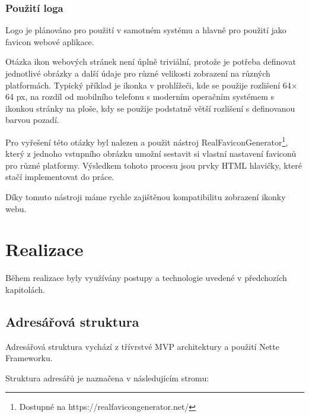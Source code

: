 \documentclass[czech,BP]{thesiskiv}
\begin{document}
	\subsection{Použití loga}
	\par Logo je plánováno pro použití v samotném systému a hlavně pro použití jako favicon webové aplikace.
	\par Otázka ikon webových stránek není úplně triviální, protože je potřeba definovat jednotlivé obrázky a další údaje pro různé velikosti zobrazení na různých platformách. Typický příklad je ikonka v prohlížeči, kde se použije rozlišení 64$\times$64 px, na rozdíl od mobilního telefonu s moderním operačním systémem s ikonkou stránky na ploše, kdy se použije podstatně větší rozlišení s definovanou barvou pozadí.
	\par Pro vyřešení této otázky byl nalezen a použit nástroj RealFaviconGenerator\footnote{Dostupné na https://realfavicongenerator.net/}, který z jednoho vstupního obrázku umožní sestavit si vlastní nastavení faviconů pro různé platformy. Výsledkem tohoto procesu jsou prvky HTML hlavičky, které stačí implementovat do práce. 
	\par Díky tomuto nástroji máme rychle zajištěnou kompatibilitu zobrazení ikonky webu.
\chapter{Realizace}
	\par Během realizace byly využívány postupy a technologie uvedené v předchozích kapitolách.
	\section{Adresářová struktura}
	\par Adresářová struktura vychází z třívrstvé MVP architektury a  použití Nette Frameworku.
	\par Struktura adresářů je naznačena v následujícím stromu:
\end{document}
